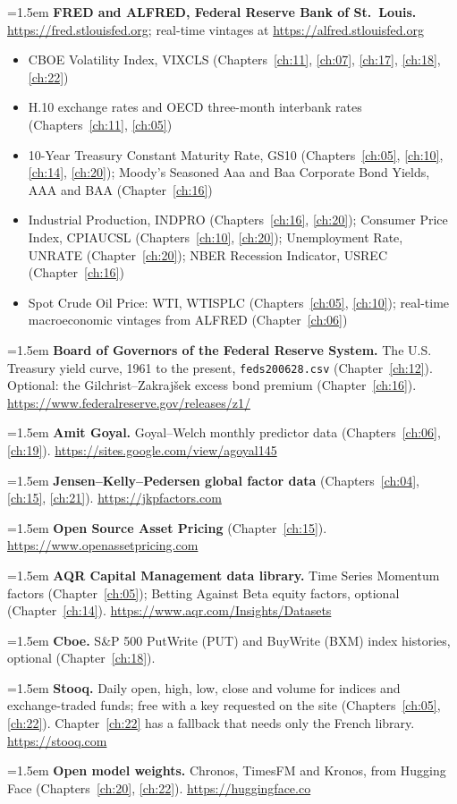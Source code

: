 \hangindent=1.5em \textbf{FRED and ALFRED, Federal Reserve Bank of St.\ Louis.} \url{https://fred.stlouisfed.org}; real-time vintages at \url{https://alfred.stlouisfed.org}
\begin{itemize}\setlength{\itemsep}{0pt}\setlength{\parskip}{0pt}
  \item CBOE Volatility Index, VIXCLS (Chapters~\ref{ch:11}, \ref{ch:07}, \ref{ch:17}, \ref{ch:18}, \ref{ch:22})
  \item H.10 exchange rates and OECD three-month interbank rates (Chapters~\ref{ch:11}, \ref{ch:05})
  \item 10-Year Treasury Constant Maturity Rate, GS10 (Chapters~\ref{ch:05}, \ref{ch:10}, \ref{ch:14}, \ref{ch:20}); Moody's Seasoned Aaa and Baa Corporate Bond Yields, AAA and BAA (Chapter~\ref{ch:16})
  \item Industrial Production, INDPRO (Chapters~\ref{ch:16}, \ref{ch:20}); Consumer Price Index, CPIAUCSL (Chapters~\ref{ch:10}, \ref{ch:20}); Unemployment Rate, UNRATE (Chapter~\ref{ch:20}); NBER Recession Indicator, USREC (Chapter~\ref{ch:16})
  \item Spot Crude Oil Price: WTI, WTISPLC (Chapters~\ref{ch:05}, \ref{ch:10}); real-time macroeconomic vintages from ALFRED (Chapter~\ref{ch:06})
\end{itemize}

\hangindent=1.5em \textbf{Board of Governors of the Federal Reserve System.} The U.S. Treasury yield curve, 1961 to the present, \texttt{feds200628.csv} (Chapter~\ref{ch:12}). Optional: the Gilchrist--Zakraj\v{s}ek excess bond premium (Chapter~\ref{ch:16}). \url{https://www.federalreserve.gov/releases/z1/}

\hangindent=1.5em \textbf{Amit Goyal.} Goyal--Welch monthly predictor data (Chapters~\ref{ch:06}, \ref{ch:19}). \url{https://sites.google.com/view/agoyal145}



\hangindent=1.5em \textbf{Jensen--Kelly--Pedersen global factor data} (Chapters~\ref{ch:04}, \ref{ch:15}, \ref{ch:21}). \url{https://jkpfactors.com}

\hangindent=1.5em \textbf{Open Source Asset Pricing} (Chapter~\ref{ch:15}). \url{https://www.openassetpricing.com}

\hangindent=1.5em \textbf{AQR Capital Management data library.} Time Series Momentum factors (Chapter~\ref{ch:05}); Betting Against Beta equity factors, optional (Chapter~\ref{ch:14}). \url{https://www.aqr.com/Insights/Datasets}

\hangindent=1.5em \textbf{Cboe.} S\&P 500 PutWrite (PUT) and BuyWrite (BXM) index histories, optional (Chapter~\ref{ch:18}).

\hangindent=1.5em \textbf{Stooq.} Daily open, high, low, close and volume for indices and exchange-traded funds; free with a key requested on the site (Chapters~\ref{ch:05}, \ref{ch:22}). Chapter~\ref{ch:22} has a fallback that needs only the French library. \url{https://stooq.com}

\hangindent=1.5em \textbf{Open model weights.} Chronos, TimesFM and Kronos, from Hugging Face (Chapters~\ref{ch:20}, \ref{ch:22}). \url{https://huggingface.co}

\endgroup

